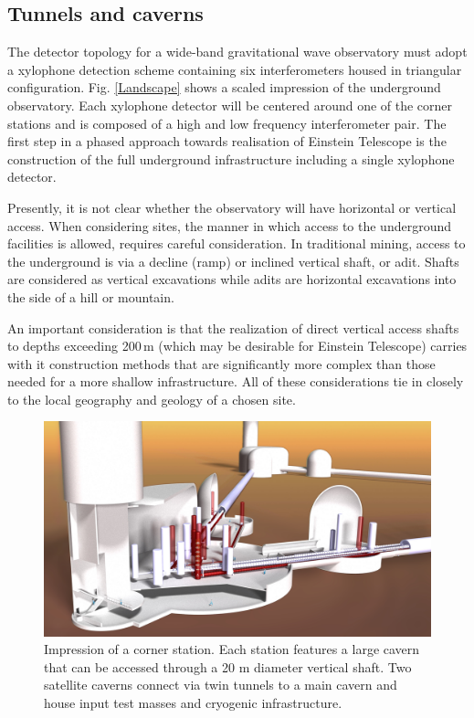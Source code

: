 \subsection{Tunnels and caverns}
The detector topology for a wide-band gravitational wave observatory must adopt a xylophone detection scheme containing six interferometers housed in triangular configuration. Fig. \ref{Landscape} shows a scaled impression of the underground observatory. Each xylophone detector will be centered around one of the corner stations and is composed of a high and low frequency interferometer pair. The first step in a phased approach towards realisation of Einstein Telescope is the construction of the full underground infrastructure including a single xylophone detector. 

Presently, it is not clear whether the observatory will have horizontal or vertical access. When considering sites, the manner in which access to the underground facilities is allowed, requires careful consideration. In traditional mining, access to the underground is via a decline (ramp) or inclined vertical shaft, or adit. Shafts are considered as vertical excavations while adits are horizontal excavations into the side of a hill or mountain. 

An important consideration is that the realization of direct vertical access shafts to depths exceeding 200\,m (which may be desirable for Einstein Telescope) carries with it construction methods that are significantly more complex than those needed for a more shallow infrastructure. All of these considerations tie in closely to the local geography and geology of a chosen site.
\begin{figure}[htbp!]
	\centering
		\includegraphics[width=17cm]{SiteInfra/TunnelsCaverns/TunnelsCavernsFigures/ShaftAccess.jpg}
		\caption{Impression of a corner station. Each station features a large cavern that can be accessed through a 20 m diameter vertical shaft. Two satellite caverns connect via twin tunnels to a main cavern and house input test masses and cryogenic infrastructure.}
	\label{shaftaccess}
\end{figure}

